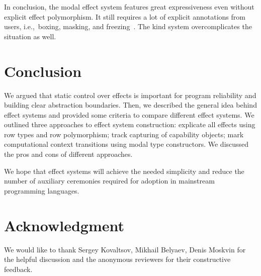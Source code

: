 \documentclass[conference]{IEEEtran}
\begin{document}
    In conclusion, the modal effect system features great expressiveness even without explicit effect polymorphism.
    It still requires a lot of explicit annotations from users, i.e.,\ boxing, masking, and freezing~\cite{emrich2020freezeml}.
    The kind system overcomplicates the situation as well.


    \section{Conclusion}

    We argued that static control over effects is important for program reliability and building clear abstraction boundaries.
    Then, we described the general idea behind effect systems and provided some criteria to compare different effect systems.
    We outlined three approaches to effect system construction: explicate all effects using row types and row polymorphism; track capturing of capability objects; mark computational context transitions using modal type constructors.
    We discussed the pros and cons of different approaches.

    We hope that effect systems will achieve the needed simplicity and reduce the number of auxiliary ceremonies required for adoption in mainstream programming languages.


    \section*{Acknowledgment}

    We would like to thank Sergey Kovaltsov, Mikhail Belyaev, Denis Moskvin for the helpful discussion and the anonymous reviewers for their constructive feedback.


    
    
\end{document}
